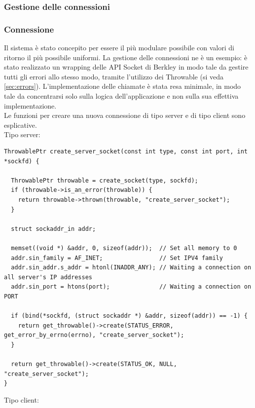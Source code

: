 \documentclass[italian]{tktltiki2}
\begin{document}
\subsubsection{Gestione delle connessioni}
\subsubsection*{Connessione}
Il sistema è stato concepito per essere il più modulare possibile con valori di ritorno il più possibile uniformi. La gestione delle connessioni ne è un esempio: è stato realizzato un wrapping delle API Socket di Berkley in modo tale da gestire tutti gli errori allo stesso modo, tramite l'utilizzo dei Throwable (si veda \ref{sec:errors}). L'implementazione delle chiamate è stata resa minimale, in modo tale da concentrarsi solo sulla logica dell'applicazione e non sulla sua effettiva implementazione.
\\
Le funzioni per creare una nuova connessione di tipo server e di tipo client sono esplicative.
\\
Tipo server:
\begin{lstlisting}
ThrowablePtr create_server_socket(const int type, const int port, int *sockfd) {

  ThrowablePtr throwable = create_socket(type, sockfd);
  if (throwable->is_an_error(throwable)) {
    return throwable->thrown(throwable, "create_server_socket");
  }

  struct sockaddr_in addr;

  memset((void *) &addr, 0, sizeof(addr));  // Set all memory to 0
  addr.sin_family = AF_INET;                // Set IPV4 family
  addr.sin_addr.s_addr = htonl(INADDR_ANY); // Waiting a connection on all server's IP addresses
  addr.sin_port = htons(port);              // Waiting a connection on PORT

  if (bind(*sockfd, (struct sockaddr *) &addr, sizeof(addr)) == -1) {
    return get_throwable()->create(STATUS_ERROR, get_error_by_errno(errno), "create_server_socket");
  }

  return get_throwable()->create(STATUS_OK, NULL, "create_server_socket");
}
\end{lstlisting}
Tipo client:
\end{document}
